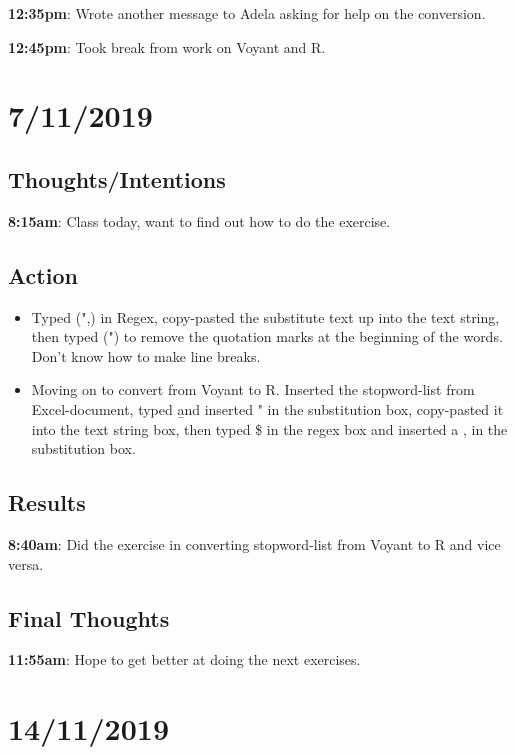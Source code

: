 \documentclass{article}
\begin{document}
\textbf{12:35pm}: Wrote another message to Adela asking for help on the conversion.


\textbf{12:45pm}: Took break from work on Voyant and R.

\section{7/11/2019}

\subsection{Thoughts/Intentions}

\textbf{8:15am}: Class today, want to find out how to do the exercise.

\subsection{Action}

\begin{itemize}
    \item Typed (",) in Regex, copy-pasted the substitute text up into the text string, then typed (") to remove the quotation marks at the beginning of the words. Don't know how to make line breaks.
    \item Moving on to convert from Voyant to R. Inserted the stopword-list from Excel-document, typed \b and inserted " in the substitution box, copy-pasted it into the text string box, then typed \$ in the regex box and inserted a , in the substitution box.
\end{itemize}

\subsection{Results}

\textbf{8:40am}: Did the exercise in converting stopword-list from Voyant to R and vice versa.

\subsection{Final Thoughts}

\textbf{11:55am}: Hope to get better at doing the next exercises.

\section{14/11/2019}
\end{document}
